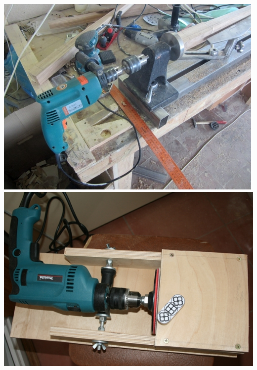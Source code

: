 \clearpage
{}\label{fig:drelstans}
\noindent\includegraphics[height=0.528\textheight]{tech/tools/DrelLathe.jpg}
\noindent\includegraphics[height=0.528\textheight]{tech/tools/DrelShliph.jpg}

